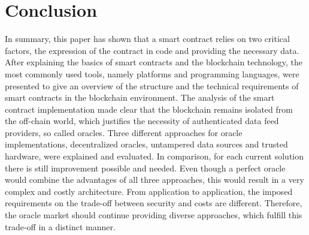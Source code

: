 \documentclass[conference]{IEEEtran}
\begin{document}




\section{Conclusion}
In summary, this paper has shown that a smart contract relies on two critical factors, the expression of the contract in code and providing the necessary data. After explaining the basics of smart contracts and the blockchain technology, the most commonly used tools, namely platforms and programming languages, were presented to give an overview of the structure and the technical requirements of smart contracts in the blockchain environment. The analysis of the smart contract implementation made clear that the blockchain remains isolated from the off-chain world, which justifies the necessity of authenticated data feed providers, so called oracles. Three different approaches for oracle implementations, decentralized oracles, untampered data sources and trusted hardware, were explained and evaluated. In comparison, for each current solution there is still improvement possible and needed. Even though a perfect oracle would combine the advantages of all three approaches, this would result in a very complex and costly architecture. From application to application, the imposed requirements on the trade-off between security and costs are different. Therefore, the oracle market should continue providing diverse approaches, which fulfill this trade-off in a distinct manner.  







%





\end{document}
